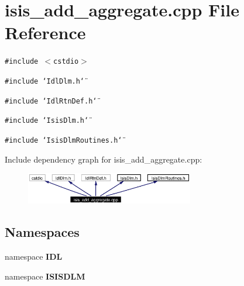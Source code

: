 \section{isis\_\-add\_\-aggregate.cpp File Reference}
\label{isis__add__aggregate_8cpp}
{\tt \#include $<$cstdio$>$}\par
{\tt \#include \char`\"{}Idl\-Dlm.h\char`\"{}}\par
{\tt \#include \char`\"{}Idl\-Rtn\-Def.h\char`\"{}}\par
{\tt \#include \char`\"{}Isis\-Dlm.h\char`\"{}}\par
{\tt \#include \char`\"{}Isis\-Dlm\-Routines.h\char`\"{}}\par


Include dependency graph for isis\_\-add\_\-aggregate.cpp:\begin{figure}[H]
\begin{center}
\leavevmode
\includegraphics[width=208pt]{isis__add__aggregate_8cpp__incl}
\end{center}
\end{figure}
\subsection*{Namespaces}
\begin{CompactItemize}
\item 
namespace {\bf IDL}
\item 
namespace {\bf ISISDLM}
\end{CompactItemize}
